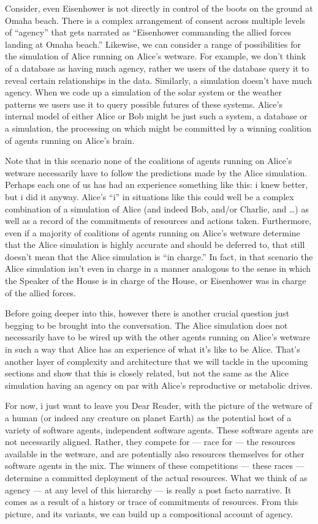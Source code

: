 Consider, even Eisenhower is not directly in control of the boots on the ground at Omaha beach. There is a complex arrangement of consent across multiple levels of ``agency'' that gets narrated as ``Eisenhower commanding the allied forces landing at Omaha beach.'' Likewise, we can consider a range of possibilities for the simulation of Alice running on Alice's wetware. For example, we don't think of a database as having much agency, rather we users of the database query it to reveal certain relationships in the data. Similarly, a simulation doesn't have much agency. When we code up a simulation of the solar system or the weather patterns we users use it to query possible futures of these systems. Alice's internal model of either Alice or Bob might be just such a system, a database or a simulation, the processing on which might be committed by a winning coalition of agents running on Alice's brain.

Note that in this scenario none of the coalitions of agents running on Alice's wetware necessarily have to follow the predictions made by the Alice simulation. Perhaps each one of us has had an experience something like this: i knew better, but i did it anyway. Alice's ``i'' in situations like this could well be a complex combination of a simulation of Alice (and indeed Bob, and/or Charlie, and \ldots{}) as well as a record of the commitments of resources and actions taken. Furthermore, even if a majority of coalitions of agents running on Alice's wetware determine that the Alice simulation is highly accurate and should be deferred to, that still doesn't mean that the Alice simulation is ``in charge.'' In fact, in that scenario the Alice simulation isn't even in charge in a manner analogous to the sense in which the Speaker of the House is in charge of the House, or Eisenhower was in charge of the allied forces.

Before going deeper into this, however there is another crucial question just begging to be brought into the conversation. The Alice simulation does not necessarily have to be wired up with the other agents running on Alice's wetware in such a way that Alice has an experience of what it's like to be Alice. That's another layer of complexity and architecture that we will tackle in the upcoming sections and show that this is closely related, but not the same as the Alice simulation having an agency on par with Alice's reproductive or metabolic drives.

For now, i just want to leave you Dear Reader, with the picture of the wetware of a human (or indeed any creature on planet Earth) as the potential host of a variety of software agents, independent software agents. These software agents are not necessarily aligned. Rather, they compete for --- race for --- the resources available in the wetware, and are potentially also resources themselves for other software agents in the mix. The winners of these competitions --- these races --- determine a committed deployment of the actual resources. What we think of as agency --- at any level of this hierarchy --- is really a post facto narrative. It comes as a result of a history or trace of commitments of resources. From this picture, and its variants, we can build up a compositional account of agency.

